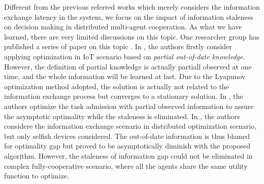Different from the previous referred works which merely considers the information exchange latency in the system, we focus on the impact of information staleness on decision making in distributed multi-agent cooperation.
As what we have learned, there are very limited discussions on this topic.
One researcher group has published a series of paper on this topic \cite{JSAC17-LyuX,TOC18-LyuX,TWC18-LyuX}.
In \cite{JSAC17-LyuX}, the authors firstly consider applying optimization in IoT scenario based on \emph{partial out-of-date knowledge}.
However, the definition of partial knowledge is actually partiall observed at one time, and the whole information will be learned at last.
Due to the Lyapunov optimization method adopted, the solution is actually not related to the information exchange process but converges to a stationary solution.
In \cite{TOC18-LyuX}, the authors optimize the task admission with partial observed information to assure the asymptotic optimality while the staleness is eliminated.
In \cite{TWC18-LyuX}, the authors considere the information exchange scenario in distributed optimization scenario, but only selfish devices considered.
The out-of-date information is thus blamed for optimality gap but proved to be asymptotically diminish with the proposed algorithm.
However, the staleness of information gap could not be eliminated in complex fully-cooperative scenario, where all the agents share the same utility function to optimize.

